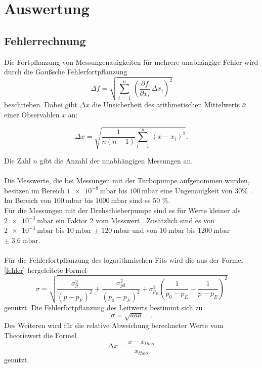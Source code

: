 \newpage 
\section{Auswertung}

        \subsection{Fehlerrechnung}
        \noindent
        Die Fortpflanzung von Messungenauigkeiten für mehrere unabhängige Fehler wird durch die Gaußsche Fehlerfortpflanzung
        \begin{equation*}
        \Delta f = \sqrt{\sum_{i \, = \, 1}^{n} \, \left(\frac{\partial f}{\partial x_i} \, \Delta x_i\right)^2}
        \label{fehler}
        \end{equation*}
        beschrieben. Dabei gibt $\Delta x$ die Unsicherheit des arithmetischen Mittelwerts $\bar{x}$ einer Observablen $x$ an:
        
        \begin{equation*}
        \Delta x =  \sqrt{\frac{1}{n(n-1)} \sum_{i \, = \, 1}^{n} \, \left(\bar{x}- x_i\right)^2}.
        \end{equation*}

        \noindent
        Die Zahl $n$ gibt die Anzahl der unabhängigen Messungen an.\\\\
        Die Messwerte, die bei Messungen mit der Turbopumpe aufgenommen wurden, besitzen im Bereich $\SI{1e-8}{\milli\bar}$ bis $\SI{100}{\milli\bar}$ eine Ungenauigkeit von $30$\% \cite{V70}.
        Im Bereich von $\SI{100}{\milli\bar}$ bis $\SI{1000}{\milli\bar}$ sind es $50$ \%.\\
        Für die Messungen mit der Drehschieberpumpe sind es für Werte kleiner als $\SI{2e-3}{\milli\bar}$ ein Faktor $2$ vom Messwert \cite{V70}.
        Zusätzlich sind es von $\SI{2e-3}{\milli\bar}$ bis $\SI{10}{\milli\bar}$ $\pm\; \SI{120}{\milli\bar}$ 
        und von $\SI{10}{\milli\bar}$ bis $\SI{1200}{\milli\bar}$ $\pm \;\SI{3.6}{\milli\bar}$.\\\\
        Für die Fehlerfortpflanzung des logarithmischen Fits wird die aus der Formel \ref*{fehler} hergeleitete Formel 
        \begin{equation*}
          \sigma = \sqrt{\frac{\sigma_p^2}{(p-p_E)^2}+\frac{\sigma_{p0}^2}{(p_0-p_E)^2}+\sigma_{p_E}^2 \left(\frac{1}{p_0-p_E}-\frac{1}{p-p_E}\right)^2}
        \end{equation*}
        genutzt. Die Fehlerfortpflanzung des Leitwerts bestimmt sich zu
        \begin{equation*}
          \sigma = \sqrt{aaa} \quad .
        \end{equation*}
        Des Weiteren wird für die relative Abweichung berechneter Werte vom Theoriewert die Formel 
        \begin{equation*}
          \increment x = \frac{x - x_{theo}}{x_{theo}}
        \end{equation*}
        genutzt.

